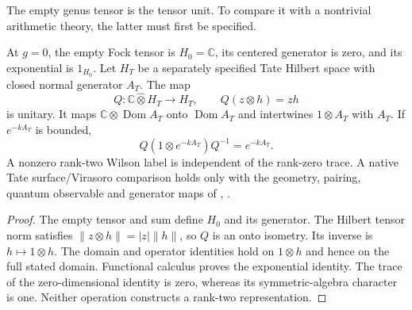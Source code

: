 The empty genus tensor is the tensor unit. To compare it with a
nontrivial arithmetic theory, the latter must first be specified.

\begin{corollary}
\label{v4-arith:w9-r6:cor:g-zero}
At \(g=0\), the empty Fock tensor is \(H_0=\mathbb C\), its
centered generator is zero, and its exponential is \(1_{H_0}\).
Let \(H_T\) be a separately specified Tate Hilbert space with closed
normal generator \(A_T\). The map
\[
 Q:\mathbb C\widehat\otimes H_T\longrightarrow H_T,
 \qquad Q(z\otimes h)=zh
\]
is unitary. It maps \(\mathbb C\otimes\operatorname{Dom}A_T\)
onto \(\operatorname{Dom}A_T\) and intertwines
\(1\otimes A_T\) with \(A_T\). If \(e^{-kA_T}\) is bounded,
\[
 Q(1\otimes e^{-kA_T})Q^{-1}=e^{-kA_T}.
\]
A nonzero rank-two Wilson label is independent of the rank-zero
trace. A native Tate surface/Virasoro comparison holds only with
the geometry, pairing, quantum observable and generator maps of
, .
\end{corollary}
\begin{proof}
The empty tensor and sum define \(H_0\) and its generator.
The Hilbert tensor norm satisfies \(\|z\otimes h\|=|z|\|h\|\),
so \(Q\) is an onto isometry. Its inverse is \(h\mapsto1\otimes h\).
The domain and operator identities hold on \(1\otimes h\) and
hence on the full stated domain. Functional calculus proves the
exponential identity. The trace of the zero-dimensional identity
is zero, whereas its symmetric-algebra character is one.
Neither operation constructs a rank-two representation.
\end{proof}

